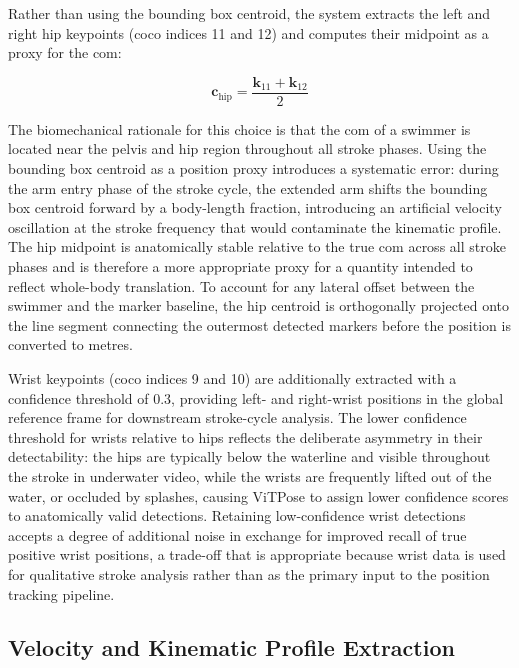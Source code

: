 Rather than using the bounding box centroid, the system extracts the left and right hip
keypoints (\gls{coco} indices 11 and 12) and computes their midpoint as a proxy for the \gls{com}:

\begin{equation}
    \mathbf{c}_{\text{hip}} = \frac{\mathbf{k}_{11} + \mathbf{k}_{12}}{2}
\end{equation}

The biomechanical rationale for this choice is that the \gls{com} of a swimmer is located
near the pelvis and hip region throughout all stroke phases. Using the bounding box centroid
as a position proxy introduces a systematic error: during the arm entry phase of the stroke
cycle, the extended arm shifts the bounding box centroid forward by a body-length fraction,
introducing an artificial velocity oscillation at the stroke frequency that would contaminate
the kinematic profile. The hip midpoint is anatomically stable relative to the true \gls{com} across
all stroke phases and is therefore a more appropriate proxy for a quantity intended to reflect
whole-body translation. To account for any lateral offset between the swimmer and the marker
baseline, the hip centroid is orthogonally projected onto the line segment connecting the
outermost detected markers before the position is converted to metres.

Wrist keypoints (\gls{coco} indices 9 and 10) are additionally extracted with a confidence threshold
of $0.3$, providing left- and right-wrist positions in the global reference frame for
downstream stroke-cycle analysis. The lower confidence threshold for wrists relative to hips
reflects the deliberate asymmetry in their detectability: the hips are typically below the
waterline and visible throughout the stroke in underwater video, while the wrists are frequently lifted out of the water, or occluded by splashes, causing ViTPose to assign lower confidence scores to anatomically valid detections. Retaining low-confidence wrist detections accepts a degree of additional noise in exchange for improved recall of true positive wrist positions, a trade-off that is appropriate because wrist data is
used for qualitative stroke analysis rather than as the primary input to the position tracking
pipeline.

\subsection{Velocity and Kinematic Profile Extraction}

